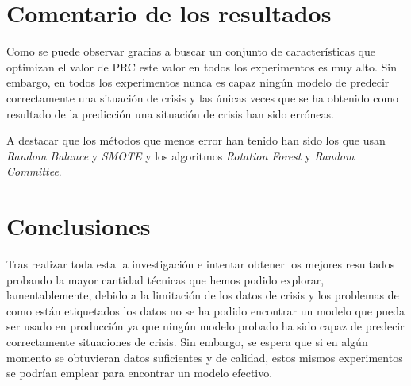 \documentclass[a4paper,12pt,twoside,oldfontcommands]{memoir}
\begin{document}
\section{Comentario de los resultados}
Como se puede observar gracias a buscar un conjunto de características que optimizan el valor de PRC este valor en todos los experimentos es muy alto. Sin embargo, en todos los experimentos nunca es capaz ningún modelo de predecir correctamente una situación de crisis y las únicas veces que se ha obtenido como resultado de la predicción una situación de crisis han sido erróneas.

A destacar que los métodos que menos error han tenido han sido los que usan \textit{Random Balance} y \textit{SMOTE} y los algoritmos \textit{Rotation Forest} y \textit{Random Committee}.

\section{Conclusiones}
Tras realizar toda esta la investigación e intentar obtener los mejores resultados probando la mayor cantidad técnicas que hemos podido explorar, lamentablemente, debido a la limitación de los datos de crisis y los problemas de como están etiquetados los datos no se ha podido encontrar un modelo que pueda ser usado en producción ya que ningún modelo probado ha sido capaz de predecir correctamente situaciones de crisis. Sin embargo, se espera que si en algún momento se obtuvieran datos suficientes y de calidad, estos mismos experimentos se podrían emplear para encontrar un modelo efectivo. 



\end{document}
